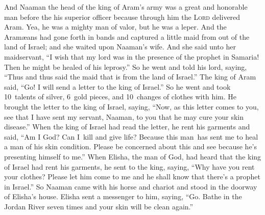 
\begin{inparaenum}
   And Naaman the head of the king of Aram's army was a great and honorable man before the his superior officer because through him the \textsc{Lord} delivered Aram. Yea, he was a mighty man of valor, but he was a leper.%
   And the Aram\ae{}ans had gone forth in bands and captured a little maid from out of the land of Israel; and she waited upon Naaman's wife.%
   And she said unto her maidservant, ``I wish that my lord was in the presence of the prophet in Samaria! Then he might be healed of his leprosy.''%
   So he went and told his lord, saying, ``Thus and thus said the maid that is from the land of Israel.''%
   The king of Aram said, ``Go! I will send a letter to the king of Israel.'' So he went and took 10~talents of silver, 6~gold pieces, and 10~changes of clothes with him.%
   He brought the letter to the king of Israel, saying, ``Now, as this letter comes to you, see that I have sent my servant, Naaman, to you that he may cure your skin disease.''%
   When the king of Israel had read the letter, he rent his garments and said, ``Am I God? Can I\understood\ kill and give life? Because this man\understood\ has sent me to heal a man of his skin condition. Please be concerned about this and see because he's presenting himself to me.''%
   When Elisha, the man of God, had heard that the king of Israel had rent his garments, he sent to the king, saying, ``Why have you rent your clothes? Please let him come to me and he shall know that there's a prophet in Israel.''%
   So Naaman came with his horse and chariot and stood in the doorway of Elisha's house.%
   Elisha sent a messenger to him, saying, ``Go. Bathe in the Jordan River seven times and your skin will be clean again.''%

\end{inparaenum}
